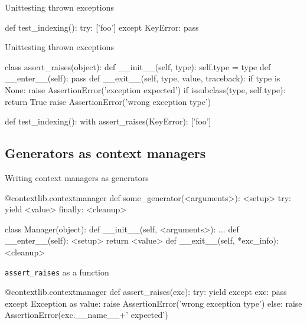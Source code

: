 \documentclass{beamer}
\begin{document}
\begin{frame}[fragile]{Unittesting thrown exceptions}
  \begin{pycode}
    def test_indexing():
       try:
          {}['foo']
       except KeyError:
          pass
  \end{pycode}
\end{frame}

\begin{frame}[fragile]{Unittesting thrown exceptions}
  \begin{pycode}
    class assert_raises(object):
        def __init__(self, type):
            self.type = type
        def __enter__(self):
            pass
        def __exit__(self, type, value, traceback):
            if type is None:
                raise AssertionError('exception expected')
            if issubclass(type, self.type):
                return True
            raise AssertionError('wrong exception type')
  \end{pycode}
  \pause
  \begin{pycode}
    def test_indexing():
        with assert_raises(KeyError):
            {}['foo']
  \end{pycode}
\end{frame}

\subsection{Generators as context managers}

\begin{frame}[fragile]{Writing context managers as generators}
  \begin{pycode}
    @contextlib.contextmanager
    def some_generator(<arguments>):
        <setup>
        try:
            yield <value>
        finally:
            <cleanup>
  \end{pycode}
  \pause
  \begin{pycode}
    class Manager(object):
        def __init__(self, <arguments>):
            ...
        def __enter__(self):
            <setup>
            return <value>
        def __exit__(self, *exc_info):
            <cleanup>
  \end{pycode}
\end{frame}

\begin{frame}[fragile]{\texttt{assert\_raises} as a function}
  \begin{pycode}
    @contextlib.contextmanager
    def assert_raises(exc):
        try:
            yield
        except exc:
            pass
        except Exception as value:
            raise AssertionError('wrong exception type')
        else:
            raise AssertionError(exc.__name__+' expected')
  \end{pycode}
\end{frame}
\end{document}
